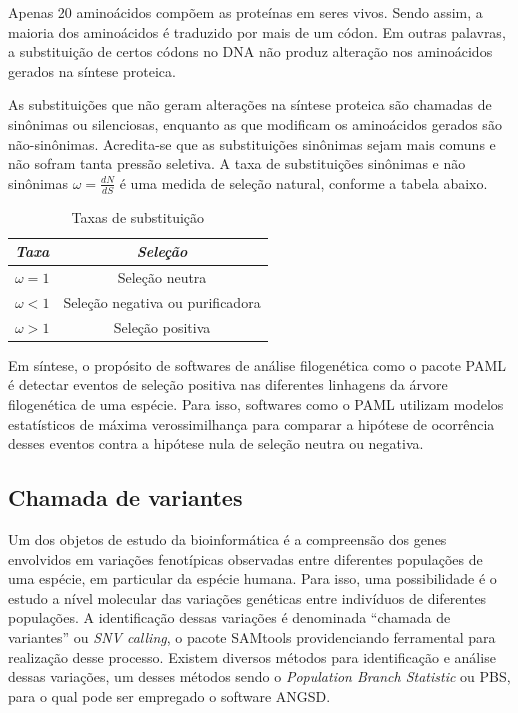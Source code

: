\documentclass[cic,tc]{iiufrgs}
\begin{document}
Apenas 20 aminoácidos compõem as proteínas em seres vivos. Sendo assim, a
maioria dos aminoácidos é traduzido por mais de um códon. Em outras palavras, a
substituição de certos códons no DNA não produz alteração nos aminoácidos
gerados na síntese proteica.

As substituições que não geram alterações na síntese proteica são chamadas de
sinônimas ou silenciosas, enquanto as que modificam os aminoácidos gerados são
não-sinônimas. Acredita-se que as substituições sinônimas sejam mais comuns e
não sofram tanta pressão seletiva. A taxa de substituições sinônimas e não
sinônimas $\omega = \frac{dN}{dS}$ é uma medida de seleção natural, conforme a
tabela abaixo.\cite{yang2002codon}

\begin{table}[h]
    \caption{Taxas de substituição}
    \centering
        \begin{tabular}{c|c}
          \hline
          \textit{Taxa}  &   \textit{Seleção} \\
          \hline
          \hline
          $\omega = 1$ & Seleção neutra \\
          $\omega < 1$ & Seleção negativa ou purificadora \\
          $\omega > 1$ & Seleção positiva \\
          \hline
        \end{tabular}
    \label{tbl:ex1}
\end{table}

Em síntese, o propósito de softwares de análise filogenética como o pacote PAML
é detectar eventos de seleção positiva nas diferentes linhagens da árvore
filogenética de uma espécie. Para isso, softwares como o PAML utilizam modelos
estatísticos de máxima verossimilhança para comparar a hipótese de ocorrência
desses eventos contra a hipótese nula de seleção neutra ou
negativa.\cite{moretti2012gcodeml}

\subsection{Chamada de variantes}
\label{sec:call}

Um dos objetos de estudo da bioinformática é a compreensão dos genes envolvidos
em variações fenotípicas observadas entre diferentes populações de uma
espécie, em particular da espécie humana.\cite{jiang2019population} Para isso,
uma possibilidade é o estudo a nível molecular das variações genéticas entre
indivíduos de diferentes populações. A identificação dessas variações é
denominada ``chamada de variantes'' ou \textit{SNV calling}, o pacote SAMtools
providenciando ferramental para realização desse
processo.\cite{pirooznia2014validation} Existem diversos métodos para
identificação e análise dessas variações, um desses métodos sendo o
\textit{Population Branch Statistic} ou PBS,\cite{jiang2019population} para o
qual pode ser empregado o software ANGSD.
\end{document}
